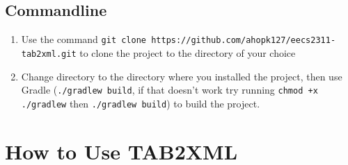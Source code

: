 \documentclass[11pt]{article}
\begin{document}
\subsection{Commandline}
\label{sec:orgd3aad04}
\begin{enumerate}
\item Use the command \texttt{git clone https://github.com/ahopk127/eecs2311-tab2xml.git} to clone the project to the directory of your choice
\item Change directory to the directory where you installed the project, then use Gradle (\texttt{./gradlew build}, if that doesn't work try running \texttt{chmod +x ./gradlew} then \texttt{./gradlew build}) to build the project.
\end{enumerate}
\newpage

\section{How to Use TAB2XML}
\label{sec:orgbf5c047}
\end{document}
